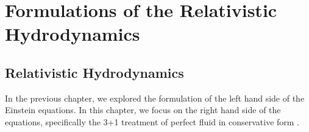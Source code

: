 
\chapter{Formulations of the Relativistic Hydrodynamics}  %

\ifpdf
    \graphicspath{{Chapter2/Figs/PDF/}{Chapter2/Figs/}}
\else
    \graphicspath{{Chapter2/Figs/}}
\fi


\section{Relativistic Hydrodynamics} %
In the previous chapter, we explored the formulation of the left hand side of the Einstein equations.
In this chapter, we focus on the right hand side of the equations,
specifically the 3+1 treatment of perfect fluid in conservative form \cite{banyuls1997numerical,rezzolla2013relativistic}.

